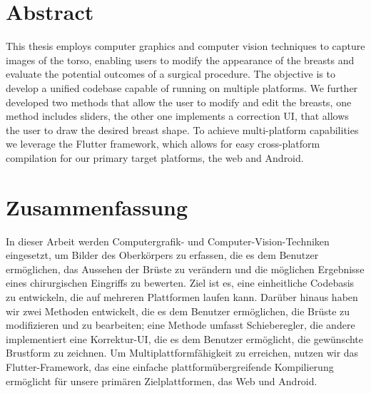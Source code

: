 \chapter*{Abstract}

This thesis employs computer graphics and computer vision techniques to capture images of the torso, enabling users to modify the appearance of the breasts and evaluate the potential outcomes of a surgical procedure. 
The objective is to develop a unified codebase capable of running on multiple platforms. We further developed two methods that allow the user to modify and edit the breasts, one method includes sliders,
the other one implements a correction UI, that allows the user to draw the desired breast shape. To achieve multi-platform capabilities we leverage the Flutter framework, which allows for easy cross-platform compilation
for our primary target platforms, the web and Android.

\cleardoublepage
\chapter*{Zusammenfassung}

In dieser Arbeit werden Computergrafik- und Computer-Vision-Techniken eingesetzt, um Bilder des Oberkörpers zu erfassen, die es dem Benutzer ermöglichen, das Aussehen der Brüste zu verändern und die möglichen Ergebnisse eines chirurgischen Eingriffs zu bewerten. 
Ziel ist es, eine einheitliche Codebasis zu entwickeln, die auf mehreren Plattformen laufen kann. Darüber hinaus haben wir zwei Methoden entwickelt, die es dem Benutzer ermöglichen, die Brüste zu modifizieren und zu bearbeiten; eine Methode umfasst Schieberegler,
die andere implementiert eine Korrektur-UI, die es dem Benutzer ermöglicht, die gewünschte Brustform zu zeichnen. Um Multiplattformfähigkeit zu erreichen, nutzen wir das Flutter-Framework, das eine einfache plattformübergreifende Kompilierung ermöglicht
für unsere primären Zielplattformen, das Web und Android.
